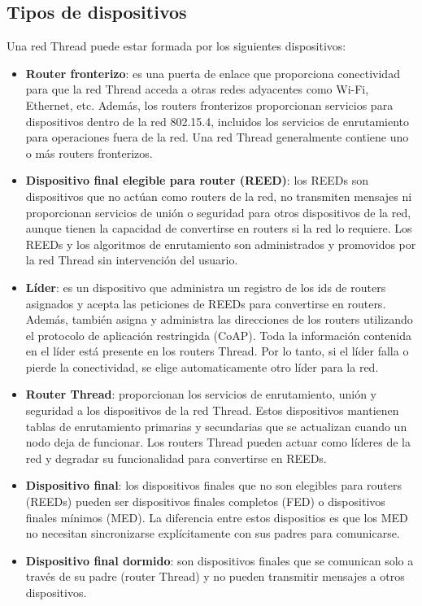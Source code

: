 \subsection{Tipos de dispositivos} %
Una red Thread puede estar formada por los siguientes dispositivos:
\begin{itemize}
\item {\bf Router fronterizo}: es una puerta de enlace que proporciona conectividad para que la red Thread acceda a otras redes adyacentes como Wi-Fi, Ethernet, etc. Además, los routers fronterizos proporcionan servicios para dispositivos dentro de la red 802.15.4, incluidos los servicios de enrutamiento para operaciones fuera de la red. Una red Thread generalmente contiene uno o más routers fronterizos.
\item {\bf Dispositivo final elegible para router (REED)}: los REEDs son dispositivos que no actúan como routers de la red, no transmiten mensajes ni proporcionan servicios de unión o seguridad para otros dispositivos de la red, aunque tienen la capacidad de convertirse en routers si la red lo requiere. Los REEDs y los algoritmos de enrutamiento son administrados y promovidos por la red Thread sin intervención del usuario.
\item {\bf Líder}: es un dispositivo que administra un registro de los ids de routers asignados y acepta las peticiones de REEDs para convertirse en routers. Además, también asigna y administra las direcciones de los routers utilizando el protocolo de aplicación restringida (CoAP). Toda la información contenida en el líder está presente en los routers Thread. Por lo tanto, si el líder falla o pierde la conectividad, se elige automaticamente otro líder para la red.
\item {\bf Router Thread}: proporcionan los servicios de enrutamiento, unión y seguridad a los dispositivos de la red Thread. Estos dispositivos mantienen tablas de enrutamiento primarias y secundarias que se actualizan cuando un nodo deja de funcionar. Los routers Thread pueden actuar como líderes de la red y degradar su funcionalidad para convertirse en REEDs.
\item {\bf Dispositivo final}: los dispositivos finales que no son elegibles para routers (REEDs) pueden ser dispositivos finales completos (FED) o dispositivos finales mínimos (MED). La diferencia entre estos dispositios es que los MED no necesitan sincronizarse explícitamente con sus padres para comunicarse.
\item {\bf Dispositivo final dormido}: son dispositivos finales que se comunican solo a través de su padre (router Thread) y no pueden transmitir mensajes a otros dispositivos.
\end{itemize}
\clearpage



